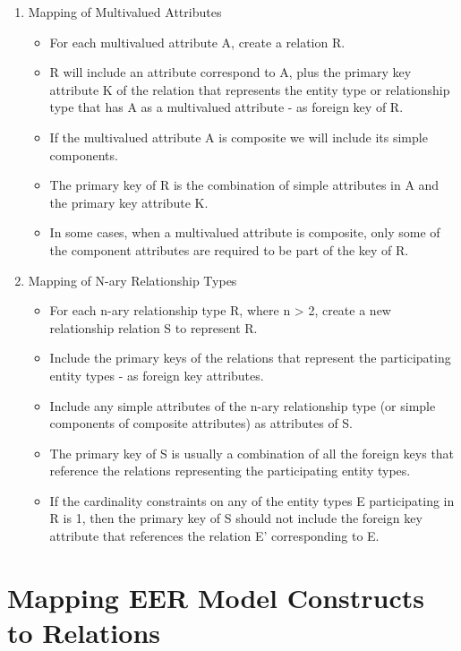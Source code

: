 \documentclass[10pt]{article}
\begin{document}
\begin{enumerate}
	\item Mapping of Multivalued Attributes 
		\begin{itemize}
			\item For each multivalued attribute A, create a relation R.
			\item R will include an attribute correspond to A, plus the primary key attribute K of the relation that represents the entity type or relationship type that has A as a multivalued attribute - as foreign key of R.
			\item If the multivalued attribute A is composite we will include its simple components.
			\item The primary key of R is the combination of simple attributes in A and the primary key attribute K.
			\item In some cases, when a multivalued attribute is composite, only some of the component attributes are required to be part of the key of R.
		\end{itemize}

	\item Mapping of N-ary Relationship Types
		\begin{itemize}
			\item For each n-ary relationship type R, where n > 2, create a new relationship relation S to represent R.
			\item Include the primary keys of the relations that represent the participating entity types - as foreign key attributes.
			\item Include any simple attributes of the n-ary relationship type (or simple components of composite attributes) as attributes of S.
			\item The primary key of S is usually a combination of all the foreign keys that reference the relations representing the participating entity types.
			\item If the cardinality constraints on any of the entity types E participating in R is 1, then the primary key of S should not include the foreign key attribute that references the relation E' corresponding to E. 
		\end{itemize}

\end{enumerate}

\section{Mapping EER Model Constructs to Relations}
\end{document}
